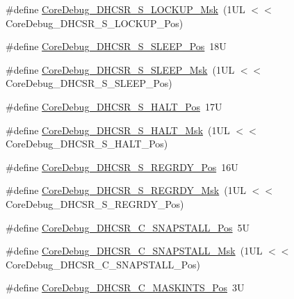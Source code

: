 \begin{DoxyCompactItemize}
\item 
\#define \mbox{\hyperlink{group___c_m_s_i_s___core_debug_ga7b67e4506d7f464ef5dafd6219739756}{Core\+Debug\+\_\+\+D\+H\+C\+S\+R\+\_\+\+S\+\_\+\+L\+O\+C\+K\+U\+P\+\_\+\+Msk}}~(1\+U\+L $<$$<$ Core\+Debug\+\_\+\+D\+H\+C\+S\+R\+\_\+\+S\+\_\+\+L\+O\+C\+K\+U\+P\+\_\+\+Pos)
\item 
\#define \mbox{\hyperlink{group___c_m_s_i_s___core_debug_ga349ccea33accc705595624c2d334fbcb}{Core\+Debug\+\_\+\+D\+H\+C\+S\+R\+\_\+\+S\+\_\+\+S\+L\+E\+E\+P\+\_\+\+Pos}}~18U
\item 
\#define \mbox{\hyperlink{group___c_m_s_i_s___core_debug_ga98d51538e645c2c1a422279cd85a0a25}{Core\+Debug\+\_\+\+D\+H\+C\+S\+R\+\_\+\+S\+\_\+\+S\+L\+E\+E\+P\+\_\+\+Msk}}~(1\+U\+L $<$$<$ Core\+Debug\+\_\+\+D\+H\+C\+S\+R\+\_\+\+S\+\_\+\+S\+L\+E\+E\+P\+\_\+\+Pos)
\item 
\#define \mbox{\hyperlink{group___c_m_s_i_s___core_debug_ga760a9a0d7f39951dc3f07d01f1f64772}{Core\+Debug\+\_\+\+D\+H\+C\+S\+R\+\_\+\+S\+\_\+\+H\+A\+L\+T\+\_\+\+Pos}}~17U
\item 
\#define \mbox{\hyperlink{group___c_m_s_i_s___core_debug_ga9f881ade3151a73bc5b02b73fe6473ca}{Core\+Debug\+\_\+\+D\+H\+C\+S\+R\+\_\+\+S\+\_\+\+H\+A\+L\+T\+\_\+\+Msk}}~(1\+U\+L $<$$<$ Core\+Debug\+\_\+\+D\+H\+C\+S\+R\+\_\+\+S\+\_\+\+H\+A\+L\+T\+\_\+\+Pos)
\item 
\#define \mbox{\hyperlink{group___c_m_s_i_s___core_debug_ga20a71871ca8768019c51168c70c3f41d}{Core\+Debug\+\_\+\+D\+H\+C\+S\+R\+\_\+\+S\+\_\+\+R\+E\+G\+R\+D\+Y\+\_\+\+Pos}}~16U
\item 
\#define \mbox{\hyperlink{group___c_m_s_i_s___core_debug_gac4cd6f3178de48f473d8903e8c847c07}{Core\+Debug\+\_\+\+D\+H\+C\+S\+R\+\_\+\+S\+\_\+\+R\+E\+G\+R\+D\+Y\+\_\+\+Msk}}~(1\+U\+L $<$$<$ Core\+Debug\+\_\+\+D\+H\+C\+S\+R\+\_\+\+S\+\_\+\+R\+E\+G\+R\+D\+Y\+\_\+\+Pos)
\item 
\#define \mbox{\hyperlink{group___c_m_s_i_s___core_debug_ga85747214e2656df6b05ec72e4d22bd6d}{Core\+Debug\+\_\+\+D\+H\+C\+S\+R\+\_\+\+C\+\_\+\+S\+N\+A\+P\+S\+T\+A\+L\+L\+\_\+\+Pos}}~5U
\item 
\#define \mbox{\hyperlink{group___c_m_s_i_s___core_debug_ga53aa99b2e39a67622f3b9973e079c2b4}{Core\+Debug\+\_\+\+D\+H\+C\+S\+R\+\_\+\+C\+\_\+\+S\+N\+A\+P\+S\+T\+A\+L\+L\+\_\+\+Msk}}~(1\+U\+L $<$$<$ Core\+Debug\+\_\+\+D\+H\+C\+S\+R\+\_\+\+C\+\_\+\+S\+N\+A\+P\+S\+T\+A\+L\+L\+\_\+\+Pos)
\item 
\#define \mbox{\hyperlink{group___c_m_s_i_s___core_debug_ga0d2907400eb948a4ea3886ca083ec8e3}{Core\+Debug\+\_\+\+D\+H\+C\+S\+R\+\_\+\+C\+\_\+\+M\+A\+S\+K\+I\+N\+T\+S\+\_\+\+Pos}}~3U
$$
\end{DoxyCompactItemize}

